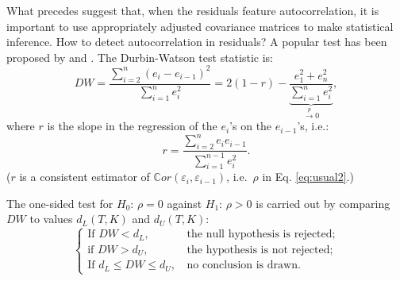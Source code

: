 \documentclass[
  12pt,
]{book}
\theoremstyle{definition}
\theoremstyle{definition}
\theoremstyle{definition}
\theoremstyle{definition}
\theoremstyle{remark}
\begin{document}
What precedes suggest that, when the residuals feature autocorrelation, it is important to use appropriately adjusted covariance matrices to make statistical inference. How to detect autocorrelation in residuals? A popular test has been proposed by \citet{Durbin_Watson_1950} and \citet{Durbin_Watson_1951}. The Durbin-Watson test statistic is:
\[
DW = \frac{\sum_{i=2}^{n}(e_i - e_{i-1})^2}{\sum_{i=1}^{n}e_i^2}= 2(1 - r) - \underbrace{\frac{e_1^2 + e_n^2}{\sum_{i=1}^{n}e_i^2}}_{\overset{p}{\rightarrow} 0},
\]
where \(r\) is the slope in the regression of the \(e_i\)'s on the \(e_{i-1}\)'s, i.e.:
\[
r = \frac{\sum_{i=2}^{n}e_i e_{i-1}}{\sum_{i=1}^{n-1}e_i^2}.
\]
(\(r\) is a consistent estimator of \(\mathbb{C}or(\varepsilon_i,\varepsilon_{i-1})\), i.e.~\(\rho\) in Eq. \eqref{eq:usual2}.)

The one-sided test for \(H_0\): \(\rho=0\) against \(H_1\): \(\rho>0\) is carried out by comparing \(DW\) to values \(d_L(T, K)\) and \(d_U(T, K)\):
\[
\left\{
\begin{array}{ll}
\mbox{If $DW < d_L$,}&\mbox{ the null hypothesis is rejected;}\\
\mbox{if $DW > d_U$,}&\mbox{ the hypothesis is not rejected;}\\
\mbox{If $d_L \le DW \le d_U$,} &\mbox{ no conclusion is drawn.}
\end{array}
\right.
\]
\end{document}
